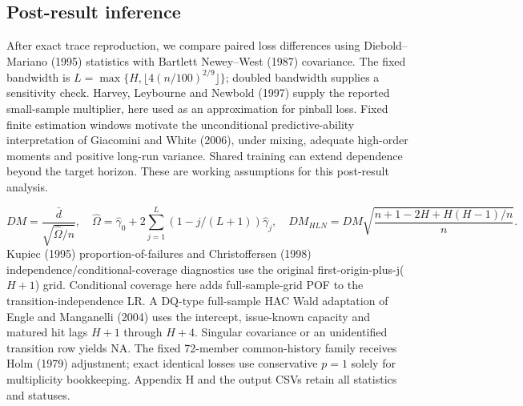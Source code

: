 \documentclass[10pt,a4paper]{article}
\begin{document}
\subsection*{Post-result inference}
After exact trace reproduction, we compare paired loss differences using Diebold--Mariano (1995) statistics with Bartlett Newey--West (1987) covariance. The fixed bandwidth is \(L=\max\{H,\lfloor4(n/100)^{2/9}\rfloor\}\); doubled bandwidth supplies a sensitivity check. Harvey, Leybourne and Newbold (1997) supply the reported small-sample multiplier, here used as an approximation for pinball loss. Fixed finite estimation windows motivate the unconditional predictive-ability interpretation of Giacomini and White (2006), under mixing, adequate high-order moments and positive long-run variance. Shared training can extend dependence beyond the target horizon. These are working assumptions for this post-result analysis.

\[
DM=\frac{\bar d}{\sqrt{\widehat\Omega/n}},\quad\widehat\Omega=\widehat\gamma_0+2\sum_{j=1}^L(1-j/(L+1))\widehat\gamma_j,\quad DM_{HLN}=DM\sqrt{\frac{n+1-2H+H(H-1)/n}{n}}.
\]
Kupiec (1995) proportion-of-failures and Christoffersen (1998) independence/conditional-coverage diagnostics use the original first-origin-plus-j(\(H+1\)) grid. Conditional coverage here adds full-sample-grid POF to the transition-independence LR. A DQ-type full-sample HAC Wald adaptation of Engle and Manganelli (2004) uses the intercept, issue-known capacity and matured hit lags \(H+1\) through \(H+4\). Singular covariance or an unidentified transition row yields NA. The fixed 72-member common-history family receives Holm (1979) adjustment; exact identical losses use conservative \(p=1\) solely for multiplicity bookkeeping. Appendix H and the output CSVs retain all statistics and statuses.
\end{document}
